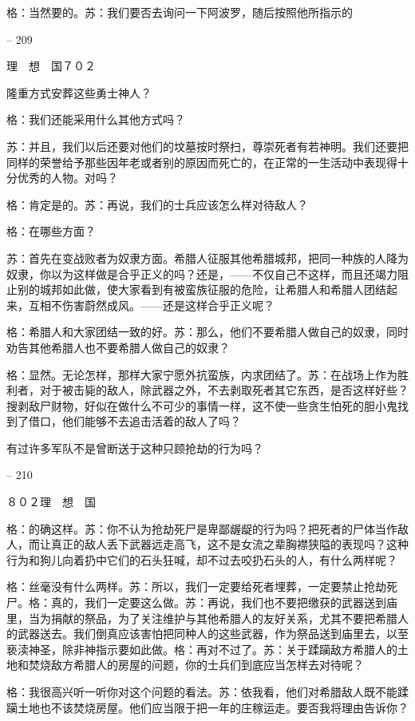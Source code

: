 \documentclass[11pt,oneside]{book}
\begin{document}
\begin{common-format}
    格：当然要的。苏：我们要否去询问一下阿波罗，随后按照他所指示的

    

-- 209

    理　想　国７０２

    隆重方式安葬这些勇士神人？

    格：我们还能采用什么其他方式吗？

    苏：并且，我们以后还要对他们的坟墓按时祭扫，尊崇死者有若神明。我们还要把同样的荣誉给予那些因年老或者别的原因而死亡的，在正常的一生活动中表现得十分优秀的人物。对吗？

    格：肯定是的。苏：再说，我们的士兵应该怎么样对待敌人？

    格：在哪些方面？

    苏：首先在变战败者为奴隶方面。希腊人征服其他希腊城邦，把同一种族的人降为奴隶，你以为这样做是合乎正义的吗？还是，——不仅自己不这样，而且还竭力阻止别的城邦如此做，使大家看到有被蛮族征服的危险，让希腊人和希腊人团结起来，互相不伤害蔚然成风。——还是这样合乎正义呢？

    格：希腊人和大家团结一致的好。苏：那么，他们不要希腊人做自己的奴隶，同时劝告其他希腊人也不要希腊人做自己的奴隶？

    格：显然。无论怎样，那样大家宁愿外抗蛮族，内求团结了。苏：在战场上作为胜利者，对于被击毙的敌人，除武器之外，不去剥取死者其它东西，是否这样好些？搜剥敌尸财物，好似在做什么不可少的事情一样，这不使一些贪生怕死的胆小鬼找到了借口，他们能够不去追击活着的敌人了吗？

    有过许多军队不是曾断送于这种只顾抢劫的行为吗？

    

-- 210

    ８０２理　想　国

    格：的确这样。苏：你不认为抢劫死尸是卑鄙龌龊的行为吗？把死者的尸体当作敌人，而让真正的敌人丢下武器远走高飞，这不是女流之辈胸襟狭隘的表现吗？这种行为和狗儿向着扔中它们的石头狂喊，却不过去咬扔石头的人，有什么两样呢？

    格：丝毫没有什么两样。苏：所以，我们一定要给死者埋葬，一定要禁止抢劫死尸。格：真的，我们一定要这么做。苏：再说，我们也不要把缴获的武器送到庙里，当为捐献的祭品，为了关注维护与其他希腊人的友好关系，尤其不要把希腊人的武器送去。我们倒真应该害怕把同种人的这些武器，作为祭品送到庙里去，以至亵渎神圣，除非神指示要如此做。格：再对不过了。苏：关于蹂躏敌方希腊人的土地和焚烧敌方希腊人的房屋的问题，你的士兵们到底应当怎样去对待呢？

    格：我很高兴听一听你对这个问题的看法。苏：依我看，他们对希腊敌人既不能蹂躏土地也不该焚烧房屋。他们应当限于把一年的庄稼运走。要否我将理由告诉你？


\end{common-format}
\end{document}
